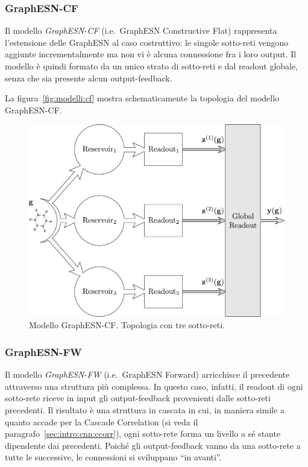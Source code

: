 \subsubsection*{GraphESN-CF}
Il modello \emph{GraphESN-CF} (i.e.\ GraphESN Constructive Flat) rappresenta l'estensione delle GraphESN al caso costruttivo: le singole sotto-reti vengono aggiunte incrementalmente ma non vi è alcuna connessione fra i loro output. Il modello è quindi formato da un unico strato di sotto-reti e dal readout globale, senza che sia presente alcun output-feedback.

La figura~\vref{fig:modelli:cf} mostra schematicamente la topologia del modello GraphESN-CF.
\begin{figure}[tb]
\centering
\includegraphics[width=0.8\columnwidth]{img/Modello-CF}
\medskip
\caption[GraphESN-CF.]{Modello GraphESN-CF. Topologia con tre sotto-reti.}
\label{fig:modelli:cf}
\end{figure}


\subsubsection*{GraphESN-FW}
Il modello \emph{GraphESN-FW} (i.e.\ GraphESN Forward) arricchisce il precedente attraverso una struttura più complessa. In questo caso, infatti, il readout di ogni sotto-rete riceve in input gli output-feedback provenienti dalle sotto-reti precedenti. Il risultato è una struttura in cascata in cui, in maniera simile a quanto accade per la Cascade Correlation (si veda il paragrafo~\ref{sec:intro:cnn:ccorr}), ogni sotto-rete forma un livello a sé stante dipendente dai precedenti. Poiché gli output-feedback vanno da una sotto-rete a tutte le successive, le connessioni si sviluppano ``in avanti''.

